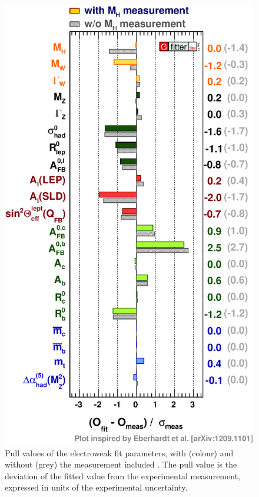 \begin{figure}[p]
	\includegraphics[width=\mediumfigwidth]{tex/conclusions/ewfit_pulls}
	\caption{Pull values of the electroweak fit parameters, with (colour) and without 
	(grey) the \mH measurement included \cite{Gfitter:2013}. The pull value is the 
	deviation of the fitted value from the experimental measurement, expressed in units of 
	the experimental uncertainty.}
	\label{fig:concl:ewfit_pulls}
\end{figure}



